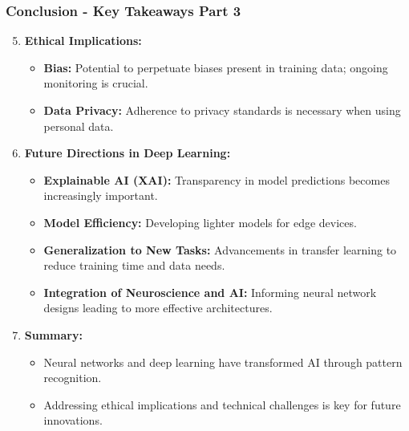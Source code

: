 \documentclass[aspectratio=169]{beamer}
\begin{document}
\begin{frame}[fragile]
    \frametitle{Conclusion - Key Takeaways Part 3}

    \begin{enumerate}
        \setcounter{enumi}{4}
        \item \textbf{Ethical Implications:}
        \begin{itemize}
            \item \textbf{Bias:} Potential to perpetuate biases present in training data; ongoing monitoring is crucial.
            \item \textbf{Data Privacy:} Adherence to privacy standards is necessary when using personal data.
        \end{itemize}
        
        \item \textbf{Future Directions in Deep Learning:}
        \begin{itemize}
            \item \textbf{Explainable AI (XAI):} Transparency in model predictions becomes increasingly important.
            \item \textbf{Model Efficiency:} Developing lighter models for edge devices.
            \item \textbf{Generalization to New Tasks:} Advancements in transfer learning to reduce training time and data needs.
            \item \textbf{Integration of Neuroscience and AI:} Informing neural network designs leading to more effective architectures.
        \end{itemize}
        
        \item \textbf{Summary:}
        \begin{itemize}
            \item Neural networks and deep learning have transformed AI through pattern recognition.
            \item Addressing ethical implications and technical challenges is key for future innovations.
        \end{itemize}
    \end{enumerate}
\end{frame}
\end{document}
